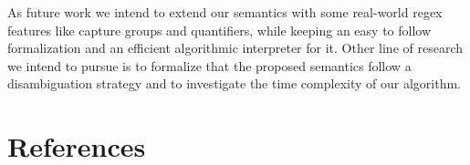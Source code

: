 \documentclass[review]{elsarticle}
\theoremstyle{definition}
\begin{document}
As future work we intend to extend our semantics with some real-world regex
features like capture groups and quantifiers, while keeping an easy to follow
formalization and an efficient algorithmic interpreter for it. Other line of
research we intend to pursue is to formalize that the proposed semantics follow 
a disambiguation strategy and to investigate the time complexity of our algorithm.

\section*{References}


\end{document}
